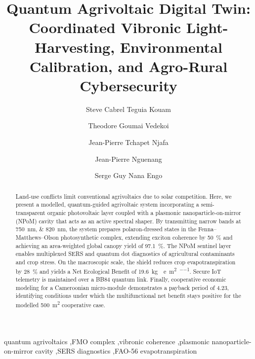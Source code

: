 \documentclass[preprint,12pt]{elsarticle}
\begin{document}
\nolinenumbers

\begin{frontmatter}

\title{Quantum Agrivoltaic Digital Twin: Coordinated Vibronic Light-Harvesting, Environmental Calibration, and Agro-Rural Cybersecurity}

\author[udla]{Steve Cabrel Teguia Kouam}
\author[uy1]{Theodore Goumai Vedekoi}
\author[uy1]{Jean-Pierre Tchapet Njafa}
\author[udla]{Jean-Pierre Nguenang}
\author[uy1]{Serge Guy Nana Engo}


\address[udla]{Department of Physics, Faculty of Science, University of Douala, Cameroon}
\address[uy1]{Department of Physics, Faculty of Science, University of Yaound\'{e} I, Cameroon}

\begin{abstract}
Land-use conflicts limit conventional agrivoltaics due to solar competition. Here, we present a modelled, quantum-guided agrivoltaic system incorporating a semi-transparent organic photovoltaic layer coupled with a plasmonic nanoparticle-on-mirror (NPoM) cavity that acts as an active spectral shaper. By transmitting narrow bands at \qtylist{750;820}{\nm}, the system prepares polaron-dressed states in the Fenna--Matthews--Olson photosynthetic complex, extending exciton coherence by \qty{50}{\percent} and achieving an area-weighted global canopy yield of \qty{97.1}{\percent}. The NPoM sentinel layer enables multiplexed SERS and quantum dot diagnostics of agricultural contaminants and crop stress. On the macroscopic scale, the shield reduces crop evapotranspiration by \qty{28}{\percent} and yields a Net Ecological Benefit of \qty{19.6}{\kg{}e\per\m\squared\per\yr}. Secure IoT telemetry is maintained over a BB84 quantum link. Finally, cooperative economic modeling for a Cameroonian micro-module demonstrates a payback period of \qty{4.23}{\yr}, identifying conditions under which the multifunctional net benefit stays positive for the modelled \qty{500}{\m\squared} cooperative case.
\end{abstract}

\begin{keyword}
quantum agrivoltaics \sep FMO complex \sep vibronic coherence \sep plasmonic nanoparticle-on-mirror cavity \sep SERS diagnostics \sep FAO-56 evapotranspiration
\end{keyword}

\end{frontmatter}
\enlargethispage{32pt}
\linenumbers
\end{document}
